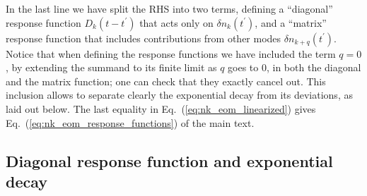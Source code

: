 \documentclass[aps,prd,notitlepage,amsfonts,amssymb,amsmath,nofootinbib,superscriptaddress,longbibliography]{revtex4-2}
\begin{document}
\begin{appendices}
\begin{align}
\begin{split}
    \label{eq:nk_eom_linearized}
\end{split}
\end{align}
In the last line we have split the RHS into two terms, defining a ``diagonal'' response function $D_{k}(t-t^{\prime})$ that acts only on $\delta n_{k}(t^{\prime})$, and a ``matrix'' response function that includes contributions from other modes  $\delta n_{k+q}(t^{\prime})$. Notice that when defining the response functions we have included the term $q=0$, by extending the summand to its finite limit as $q$ goes to 0, in both the diagonal and the matrix function; one can check that they exactly cancel out. This inclusion allows to separate clearly the exponential decay from its deviations, as laid out below. The last equality in Eq.~(\ref{eq:nk_eom_linearized}) gives Eq.~(\ref{eq:nk_eom_response_functions}) of the main text.



\subsection{Diagonal response function and exponential decay}


\end{appendices}
\end{document}
